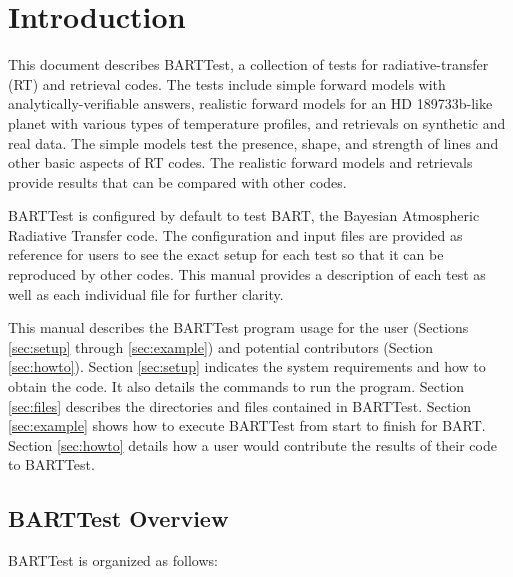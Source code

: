 \documentclass[letterpaper, 12pt]{article}
\begin{document}
\section{Introduction}
\label{sec:intro}

This document describes BARTTest, a collection of tests for 
radiative-transfer (RT) and retrieval codes. 
The tests include simple forward models with 
analytically-verifiable answers, realistic forward models for an 
HD 189733b-like planet with various types of temperature profiles, and 
retrievals on synthetic and real data. The simple models test the 
presence, shape, and strength of lines and other basic aspects of RT codes. 
The realistic forward models and retrievals provide results that can be 
compared with other codes.

BARTTest is configured by default to test BART, the Bayesian Atmospheric 
Radiative Transfer code. The configuration and input files are provided 
as reference for users to see the exact setup for each test so that it 
can be reproduced by other codes. This manual provides a description 
of each test as well as each individual file for further clarity.

This manual describes the BARTTest program usage for the user
(Sections \ref{sec:setup} through \ref{sec:example}) and
potential contributors (Section \ref{sec:howto}).  Section \ref{sec:setup} 
indicates the system requirements and how to obtain the code. 
It also details the commands to run the program.
Section \ref{sec:files} describes the directories and files contained in 
BARTTest.  Section \ref{sec:example} shows how to execute BARTTest from start 
to finish for BART.  Section \ref{sec:howto} details how a user would 
contribute the results of their code to BARTTest. 

\newpage

\subsection{BARTTest Overview}

\noindent BARTTest is organized as follows:

\vspace{0.7cm}
\end{document}
